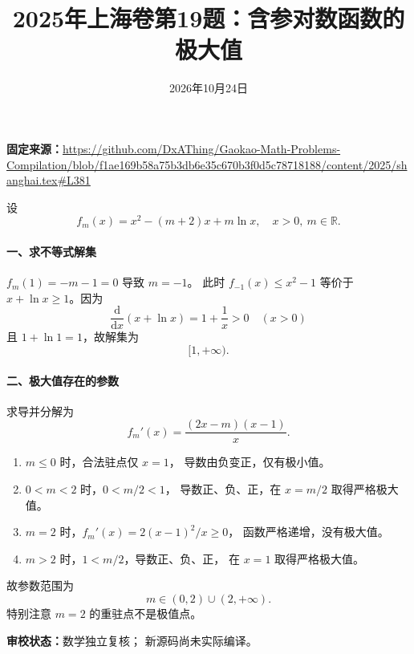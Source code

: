 \documentclass[UTF8,a4paper,11pt]{ctexart}
\title{2025年上海卷第19题：含参对数函数的极大值}
\date{2026年10月24日}
\begin{document}
\maketitle
\noindent\textbf{固定来源：}\url{https://github.com/DxAThing/Gaokao-Math-Problems-Compilation/blob/f1ae169b58a75b3db6e35c670b3f0d5c78718188/content/2025/shanghai.tex#L381}

设
\[
 f_m(x)=x^2-(m+2)x+m\ln x,\quad x>0,\ m\in\mathbb R.
\]
\paragraph{一、求不等式解集}
$f_m(1)=-m-1=0$ 导致 $m=-1$。
此时 $f_{-1}(x)\le x^2-1$ 等价于
$x+\ln x\ge1$。因为
\[
\frac{\mathrm d}{\mathrm dx}(x+\ln x)=1+\frac1x>0
\quad(x>0)
\]
且 $1+\ln1=1$，故解集为
\[
\boxed{[1,+\infty)}.
\]

\paragraph{二、极大值存在的参数}
求导并分解为
\[
f_m'(x)=\frac{(2x-m)(x-1)}{x}.
\]
\begin{enumerate}
\item $m\le0$ 时，合法驻点仅 $x=1$，
导数由负变正，仅有极小值。
\item $0<m<2$ 时，$0<m/2<1$，
导数正、负、正，在 $x=m/2$ 取得严格极大值。
\item $m=2$ 时，$f_m'(x)=2(x-1)^2/x\ge0$，
函数严格递增，没有极大值。
\item $m>2$ 时，$1<m/2$，导数正、负、正，
在 $x=1$ 取得严格极大值。
\end{enumerate}
故参数范围为
\[
\boxed{m\in(0,2)\cup(2,+\infty)}.
\]
特别注意 $m=2$ 的重驻点不是极值点。

\bigskip
\noindent\textbf{审校状态：}数学独立复核；
新源码尚未实际编译。
\end{document}
